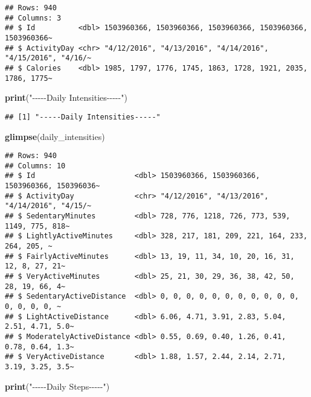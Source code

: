 \documentclass[
]{article}
\newenvironment{Shaded}{\begin{snugshade}}{\end{snugshade}}
\newcommand{\FunctionTok}[1]{\textcolor[rgb]{0.13,0.29,0.53}{\textbf{#1}}}
\newcommand{\NormalTok}[1]{#1}
\newcommand{\StringTok}[1]{\textcolor[rgb]{0.31,0.60,0.02}{#1}}
\begin{document}
\begin{verbatim}
## Rows: 940
## Columns: 3
## $ Id          <dbl> 1503960366, 1503960366, 1503960366, 1503960366, 1503960366~
## $ ActivityDay <chr> "4/12/2016", "4/13/2016", "4/14/2016", "4/15/2016", "4/16/~
## $ Calories    <dbl> 1985, 1797, 1776, 1745, 1863, 1728, 1921, 2035, 1786, 1775~
\end{verbatim}

\begin{Shaded}
\begin{Highlighting}[]
\FunctionTok{print}\NormalTok{(}\StringTok{"{-}{-}{-}{-}{-}Daily Intensities{-}{-}{-}{-}{-}"}\NormalTok{)}
\end{Highlighting}
\end{Shaded}

\begin{verbatim}
## [1] "-----Daily Intensities-----"
\end{verbatim}

\begin{Shaded}
\begin{Highlighting}[]
\FunctionTok{glimpse}\NormalTok{(daily\_intensities)}
\end{Highlighting}
\end{Shaded}

\begin{verbatim}
## Rows: 940
## Columns: 10
## $ Id                       <dbl> 1503960366, 1503960366, 1503960366, 150396036~
## $ ActivityDay              <chr> "4/12/2016", "4/13/2016", "4/14/2016", "4/15/~
## $ SedentaryMinutes         <dbl> 728, 776, 1218, 726, 773, 539, 1149, 775, 818~
## $ LightlyActiveMinutes     <dbl> 328, 217, 181, 209, 221, 164, 233, 264, 205, ~
## $ FairlyActiveMinutes      <dbl> 13, 19, 11, 34, 10, 20, 16, 31, 12, 8, 27, 21~
## $ VeryActiveMinutes        <dbl> 25, 21, 30, 29, 36, 38, 42, 50, 28, 19, 66, 4~
## $ SedentaryActiveDistance  <dbl> 0, 0, 0, 0, 0, 0, 0, 0, 0, 0, 0, 0, 0, 0, 0, ~
## $ LightActiveDistance      <dbl> 6.06, 4.71, 3.91, 2.83, 5.04, 2.51, 4.71, 5.0~
## $ ModeratelyActiveDistance <dbl> 0.55, 0.69, 0.40, 1.26, 0.41, 0.78, 0.64, 1.3~
## $ VeryActiveDistance       <dbl> 1.88, 1.57, 2.44, 2.14, 2.71, 3.19, 3.25, 3.5~
\end{verbatim}

\begin{Shaded}
\begin{Highlighting}[]
\FunctionTok{print}\NormalTok{(}\StringTok{"{-}{-}{-}{-}{-}Daily Steps{-}{-}{-}{-}{-}"}\NormalTok{)}
\end{Highlighting}
\end{Shaded}
\end{document}
